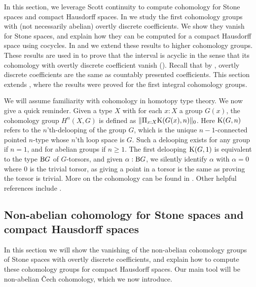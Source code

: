In this section, we leverage Scott continuity to compute cohomology for Stone spaces and compact Hausdorff spaces. In  we study the first cohomology groups with (not necessarily abelian) overtly discrete coefficients. We show they vanish for Stone spaces, and explain how they can be computed for a compact Hausdorff space using cocycles. In  and  we extend these results to higher cohomology groups. These results are used in  to prove that the interval is acyclic in the sense that its cohomology with overtly discrete coefficient vanish (). Recall that by , overtly discrete coefficients are the same as countably presented coefficients. This section extends \cite[Section 5]{synthetic-stone-duality}, where the results were proved for the first integral cohomology groups.

\begin{remark}\label{familiarWithCohomology}
  We will assume familiarity with cohomology in homotopy type theory. We now give a quick reminder. Given a type $X$ with for each $x:X$ a group $G(x)$, the cohomology group $H^n(X,G)$ is defined as $\|\Pi_{x:X} {\mathrm{K}}(G(x),n)\|_0$. 
  Here ${\mathrm{K}}(G,n)$ refers to the $n$'th-delooping of the group $G$, which is the unique $n-1$-connected pointed $n$-type whose $n$'th loop space is $G$. Such a delooping exists for any group if $n=1$, and for abelian groups if $n\geq 1$. 
  The first delooping ${\mathrm{K}}(G,1)$ is equivalent to the type $\mathrm{B} G$ of $G$-torsors, and given $\alpha:\mathrm{B} G$, we silently identify $\alpha$ with $\alpha = 0$ where $0$ is the trivial torsor, as giving a point in a torsor is the same as proving the torsor is trivial. 
  More on the cohomology can be found in \cite{evan-master-thesis}. Other helpful references include \cite{hott, warn2024, Sym, LicataFinster}.
\end{remark}


\subsection{Non-abelian cohomology for Stone spaces and compact Hausdorff spaces}
\label{first-cohomology-stone-chaus}

In this section we will show the vanishing of the non-abelian cohomology groups of Stone spaces with overtly discrete coefficients, and explain how to compute these cohomology groups for compact Hausdorff spaces. Our main tool will be non-abelian \v{C}ech cohomology, which we now introduce.

